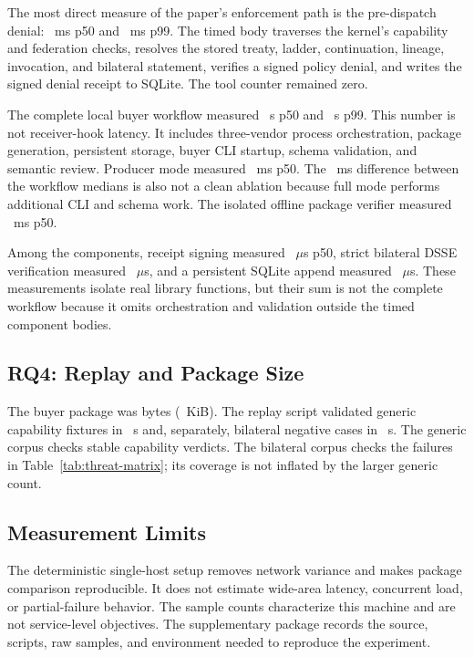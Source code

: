The most direct measure of the paper's enforcement path is the pre-dispatch
denial: \PSPredispatchDenyPFiftyMs~ms p50 and
\PSPredispatchDenyPNinetyNineMs~ms p99. The timed body traverses the kernel's
capability and federation checks, resolves the stored treaty, ladder,
continuation, lineage, invocation, and bilateral statement, verifies a signed
policy denial, and writes the signed denial receipt to SQLite. The tool counter
remained zero.

The complete local buyer workflow measured
\PSBuyerWorkflowPFiftySec~s p50 and
\PSBuyerWorkflowPNinetyNineSec~s p99. This number is not receiver-hook latency.
It includes three-vendor process orchestration, package generation, persistent
storage, buyer CLI startup, schema validation, and semantic review. Producer
mode measured \PSProducerPFiftyMs~ms p50. The
\PSBuyerPathMedianDifferenceMs~ms difference between the workflow medians is
also not a clean ablation because full mode performs additional CLI and schema
work. The isolated offline package verifier measured
\PSBuyerVerifyPFiftyMs~ms p50.

Among the components, receipt signing measured
\PSReceiptSignPFiftyUs~\(\mu\)s p50, strict bilateral DSSE verification
measured \PSBilateralVerifyPFiftyUs~\(\mu\)s, and a persistent SQLite append
measured \PSReceiptAppendPFiftyUs~\(\mu\)s. These measurements isolate real
library functions, but their sum is not the complete workflow because it omits
orchestration and validation outside the timed component bodies.

\subsection{RQ4: Replay and Package Size}

The buyer package was \PSProofPackageBytes{} bytes
(\PSProofPackageKiB~KiB). The replay script validated
\PSGenericReplayCases{} generic capability fixtures in
\PSGenericReplaySeconds~s and, separately,
\PSBilateralReplayCases{} bilateral negative cases in
\PSBilateralReplaySeconds~s. The generic corpus checks stable capability
verdicts. The bilateral corpus checks the failures in
Table~\ref{tab:threat-matrix}; its coverage is not inflated by the larger
generic count.

\subsection{Measurement Limits}

The deterministic single-host setup removes network variance and makes package
comparison reproducible. It does not estimate wide-area latency, concurrent
load, or partial-failure behavior. The sample counts characterize this machine
and are not service-level objectives. The supplementary package records the
source, scripts, raw samples, and environment needed to reproduce the
experiment.
